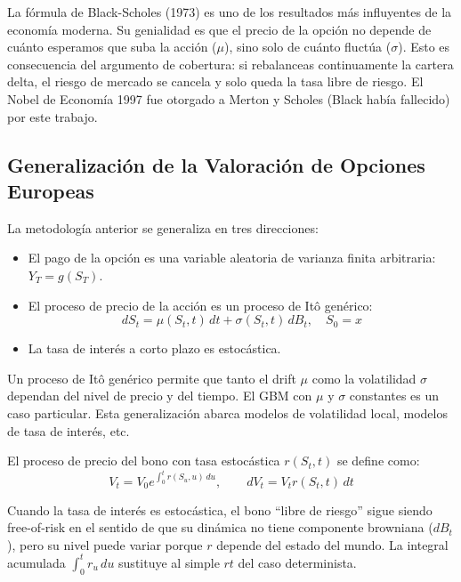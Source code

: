 \documentclass[12pt]{article}
\begin{document}
\begin{intuicion}
La f\'ormula de Black-Scholes (1973) es uno de los resultados m\'as influyentes de la econom\'ia moderna. Su genialidad es que el precio de la opci\'on no depende de cu\'anto esperamos que suba la acci\'on ($\mu$), sino solo de cu\'anto fluctúa ($\sigma$). Esto es consecuencia del argumento de cobertura: si rebalanceas continuamente la cartera delta, el riesgo de mercado se cancela y solo queda la tasa libre de riesgo. El Nobel de Econom\'ia 1997 fue otorgado a Merton y Scholes (Black hab\'ia fallecido) por este trabajo.
\end{intuicion}

\subsection{Generalizaci\'on de la Valoraci\'on de Opciones Europeas}

La metodolog\'ia anterior se generaliza en tres direcciones:
\begin{itemize}
  \item El pago de la opci\'on es una variable aleatoria de varianza finita arbitraria: $Y_T = g(S_T)$.
  \item El proceso de precio de la acci\'on es un proceso de It\^o gen\'erico:
  \begin{equation}
    dS_t = \mu(S_t, t)\,dt + \sigma(S_t, t)\,dB_t, \quad S_0 = x
  \end{equation}
  \item La tasa de inter\'es a corto plazo es estoc\'astica.
\end{itemize}

\begin{intuicionmat}
Un proceso de It\^o gen\'erico permite que tanto el drift $\mu$ como la volatilidad $\sigma$ dependan del nivel de precio y del tiempo. El GBM con $\mu$ y $\sigma$ constantes es un caso particular. Esta generalizaci\'on abarca modelos de volatilidad local, modelos de tasa de inter\'es, etc.
\end{intuicionmat}

El proceso de precio del bono con tasa estoc\'astica $r(S_t, t)$ se define como:
\begin{equation}
  V_t = V_0 e^{\int_0^t r(S_u, u)\,du}, \qquad dV_t = V_t r(S_t, t)\,dt
\end{equation}

\begin{intuicionmat}
Cuando la tasa de inter\'es es estoc\'astica, el bono ``libre de riesgo'' sigue siendo free-of-risk en el sentido de que su din\'amica no tiene componente browniana ($dB_t$), pero su nivel puede variar porque $r$ depende del estado del mundo. La integral acumulada $\int_0^t r_u\,du$ sustituye al simple $rt$ del caso determinista.
\end{intuicionmat}
\end{document}
